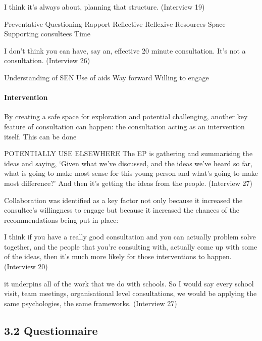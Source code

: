 \documentclass[
]{article}
\begin{document}
I think it's always about, planning that structure. (Interview 19)

Preventative Questioning Rapport Reflective Reflexive Resources Space
Supporting consultees Time

I don't think you can have, say an, effective 20 minute consultation.
It's not a consultation. (Interview 26)

Understanding of SEN Use of aids Way forward Willing to engage

\hypertarget{intervention}{%
\paragraph{Intervention}\label{intervention}}

By creating a safe space for exploration and potential challenging,
another key feature of consultation can happen: the consultation acting
as an intervention itself. This can be done

POTENTIALLY USE ELSEWHERE The EP is gathering and summarising the ideas
and saying, `Given what we've discussed, and the ideas we've heard so
far, what is going to make most sense for this young person and what's
going to make most difference?' And then it's getting the ideas from the
people. (Interview 27)

Collaboration was identified as a key factor not only because it
increased the consultee's willingness to engage but because it increased
the chances of the recommendations being put in place:

I think if you have a really good consultation and you can actually
problem solve together, and the people that you're consulting with,
actually come up with some of the ideas, then it's much more likely for
those interventions to happen. (Interview 20)

it underpins all of the work that we do with schools. So I would say
every school visit, team meetings, organisational level consultations,
we would be applying the same psychologies, the same frameworks.
(Interview 27)

\hypertarget{section}{%
\paragraph{}\label{section}}

\hypertarget{questionnaire-3}{%
\subsection{3.2 Questionnaire}\label{questionnaire-3}}
\end{document}
